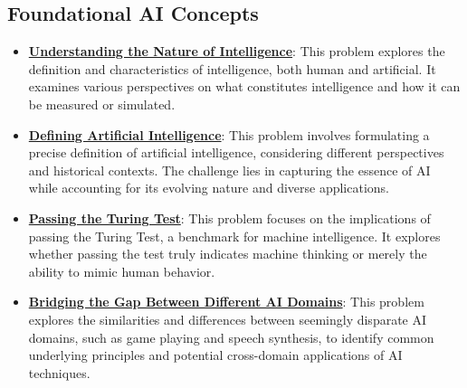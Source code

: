\documentclass{article}%
\begin{document}
\subsection{Foundational AI Concepts}%
\label{subsec:FoundationalAIConcepts}%
\begin{itemize}[leftmargin=*]%
\item \href{https://purdue.brightspace.com/d2l/common/assets/pdfjs-d2l-dist/1.0.14-legacy/web/viewer.html?file=\%2Fcontent\%2Fenforced\%2F1095467-wl.202510.CS.24300.001\%2F02L2-Intro.pdf\%3Fou\%3D1095467\&lang=en-us\&container=d2l-fileviewer-rendered-pdf\&fullscreen=d2l-fileviewer-rendered-pdf-dialog\&height=667#page=5}{\textbf{Understanding the Nature of Intelligence}}: This problem explores the definition and characteristics of intelligence, both human and artificial. It examines various perspectives on what constitutes intelligence and how it can be measured or simulated.%
\item \href{https://purdue.brightspace.com/d2l/common/assets/pdfjs-d2l-dist/1.0.14-legacy/web/viewer.html?file=\%2Fcontent\%2Fenforced\%2F1095467-wl.202510.CS.24300.001\%2F02L2-Intro.pdf\%3Fou\%3D1095467\&lang=en-us\&container=d2l-fileviewer-rendered-pdf\&fullscreen=d2l-fileviewer-rendered-pdf-dialog\&height=667#page=5}{\textbf{Defining Artificial Intelligence}}: This problem involves formulating a precise definition of artificial intelligence, considering different perspectives and historical contexts. The challenge lies in capturing the essence of AI while accounting for its evolving nature and diverse applications.%
\item \href{https://purdue.brightspace.com/d2l/common/assets/pdfjs-d2l-dist/1.0.14-legacy/web/viewer.html?file=\%2Fcontent\%2Fenforced\%2F1095467-wl.202510.CS.24300.001\%2F02L2-Intro.pdf\%3Fou\%3D1095467\&lang=en-us\&container=d2l-fileviewer-rendered-pdf\&fullscreen=d2l-fileviewer-rendered-pdf-dialog\&height=667#page=6}{\textbf{Passing the Turing Test}}: This problem focuses on the implications of passing the Turing Test, a benchmark for machine intelligence. It explores whether passing the test truly indicates machine thinking or merely the ability to mimic human behavior.%
\item \href{https://purdue.brightspace.com/d2l/common/assets/pdfjs-d2l-dist/1.0.14-legacy/web/viewer.html?file=\%2Fcontent\%2Fenforced\%2F1095467-wl.202510.CS.24300.001\%2F02L2-Intro.pdf\%3Fou\%3D1095467\&lang=en-us\&container=d2l-fileviewer-rendered-pdf\&fullscreen=d2l-fileviewer-rendered-pdf-dialog\&height=667#page=31}{\textbf{Bridging the Gap Between Different AI Domains}}: This problem explores the similarities and differences between seemingly disparate AI domains, such as game playing and speech synthesis, to identify common underlying principles and potential cross{-}domain applications of AI techniques.%
\end{itemize}
\end{document}
